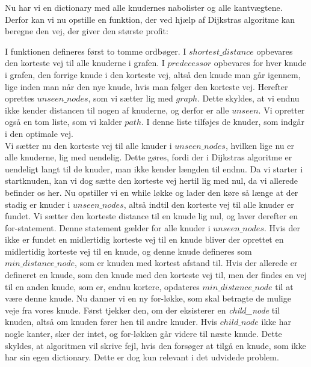 Nu har vi en dictionary med alle knudernes nabolister og alle kantvægtene. Derfor kan vi nu opstille en funktion, der ved hjælp af Dijkstras algoritme kan beregne den vej, der giver den største profit:



I funktionen defineres først to tomme ordbøger. I $shortest\_distance$ opbevares den korteste vej til alle knuderne i grafen. I $predecessor$ opbevares for hver knude i grafen, den forrige knude i den korteste vej, altså den knude man går igennem, lige inden man når den nye knude, hvis man følger den korteste vej. Herefter oprettes $unseen\_nodes$, som vi sætter lig med $graph$. Dette skyldes, at vi endnu ikke kender distancen til nogen af knuderne, og derfor er alle $unseen$. Vi opretter også en tom liste, som vi kalder $path$. I denne liste tilføjes de knuder, som indgår i den optimale vej.\\
Vi sætter nu den korteste vej til alle knuder i $unseen\_nodes$, hvilken lige nu er alle knuderne, lig med uendelig. Dette gøres, fordi der i Dijkstras algoritme er uendeligt langt til de knuder, man ikke kender længden til endnu. Da vi starter i startknuden, kan vi dog sætte den korteste vej hertil lig med nul, da vi allerede befinder os her.
Nu opstiller vi en while løkke og lader den køre så længe at der stadig er knuder i $unseen\_nodes$, altså indtil den korteste vej til alle knuder er fundet.
Vi sætter den korteste distance til en knude lig nul, og laver derefter en for-statement. Denne statement gælder for alle knuder i $unseen\_nodes$. Hvis der ikke er fundet en midlertidig korteste vej til en knude bliver der oprettet en midlertidig korteste vej til en knude, og denne knude defineres som $min\_distance\_node$, som er knuden med kortest afstand til. Hvis der allerede er defineret en knude, som den knude med den korteste vej til, men der findes en vej til en anden knude, som er, endnu kortere, opdateres $min\_distance\_node$ til at være denne knude.
Nu danner vi en ny for-løkke, som skal betragte de mulige veje fra vores knude.
Først tjekker den, om der eksisterer en \emph{child\_node} til knuden, altså om knuden fører hen til andre knuder. Hvis $child\_node$ ikke har nogle kanter, sker der intet, og for-løkken går videre til næste knude. Dette skyldes, at algoritmen vil skrive fejl, hvis den forsøger at tilgå en knude, som ikke har sin egen dictionary. Dette er dog kun relevant i det udvidede problem.

